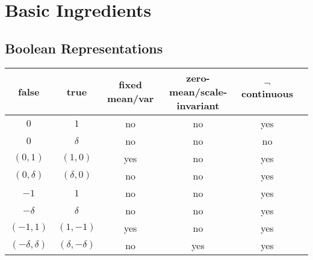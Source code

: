 %
\chapter{Basic Ingredients}
%



\section{Boolean Representations}

\begin{center}
  \begin{tabular}{@{}cc|cccc@{}}
    \toprule
    false & true & fixed mean/var & zero-mean/scale-invariant & $\neg$ continuous \\
    \midrule
    $0$ & $1$ & no & no & yes \\
    $0$ & $\delta$ & no & no & no \\
    $(0,1)$ & $(1,0)$ & yes & no & yes \\
    $(0,\delta)$ & $(\delta,0)$ & no & no & yes \\
    $-1$ & $1$ & no & no & yes \\
    $-\delta$ & $\delta$ & no & no & yes \\
    $(-1, 1)$ & $(1, -1)$ & yes & no & yes \\
    $(-\delta,\delta)$ & $(\delta,-\delta)$ & no & yes & yes \\
    \bottomrule
  \end{tabular}
\end{center}